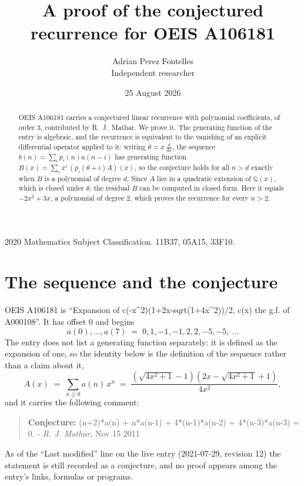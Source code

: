 \documentclass[11pt,a4paper]{article}
\title{A proof of the conjectured recurrence for OEIS A106181}
\author{Adrian Perez Fontelles\\ \small Independent researcher}
\date{25 August 2026}
\theoremstyle{plain}
\theoremstyle{definition}
\begin{document}
\maketitle

\begin{abstract}
OEIS A106181 carries a conjectured linear recurrence with polynomial coefficients, of
order 3, contributed by R.~J.~Mathar. We prove it. The generating function of the
entry is algebraic, and the recurrence is equivalent to the vanishing of an explicit
differential operator applied to it: writing $\theta=x\,\frac{d}{dx}$, the sequence
$b(n)=\sum_{i}p_{i}(n)a(n-i)$ has generating function
$B(x)=\sum_{i}x^{i}\,(p_{i}(\theta+i)A)(x)$, so the conjecture holds for all $n>d$ exactly
when $B$ is a polynomial of degree $d$. Since $A$ lies in a quadratic extension of
$\mathbb{Q}(x)$, which is closed under $\theta$, the residual $B$ can be computed in
closed form. Here it equals $- 2 x^{2} + 3 x$, a polynomial of degree $2$, which proves
the recurrence for every $n>2$.
\end{abstract}

\noindent\small 2020 Mathematics Subject Classification. 11B37, 05A15, 33F10.\normalsize

\section{The sequence and the conjecture}

OEIS A106181 is ``Expansion of c(-x\^{}2)(1+2x-sqrt(1+4x\^{}2))/2, c(x) the g.f. of A000108''. It has offset $0$ and begins
\[
a(0),\dots,a(7)\;=\;0, 1, -1, -1, 2, 2, -5, -5,\ \dots
\]
The entry does not list a generating function separately: it is defined as the
expansion of one, so the identity below is the definition of the sequence rather than a
claim about it,
\begin{equation}\label{eq:gf}
A(x)\;=\;\sum_{n\ge 0} a(n)\,x^{n}\;=\;\frac{\left(\sqrt{4 x^{2} + 1} - 1\right) \left(2 x - \sqrt{4 x^{2} + 1} + 1\right)}{4 x^{2}} ,
\end{equation}
and it carries the following comment:
\begin{quote}\small
\textbf{Conjecture:} (n+2)*a(n) + n*a(n-1) + 4*(n-1)*a(n-2) + 4*(n-3)*a(n-3) = 0. - \emph{R. J. Mathar}, Nov 15 2011
\end{quote}
As of the ``Last modified'' line on the live entry (2021-07-29, revision 12) the
statement is still recorded as a conjecture, and no proof appears among the entry's links,
formulas or programs.
\end{document}
